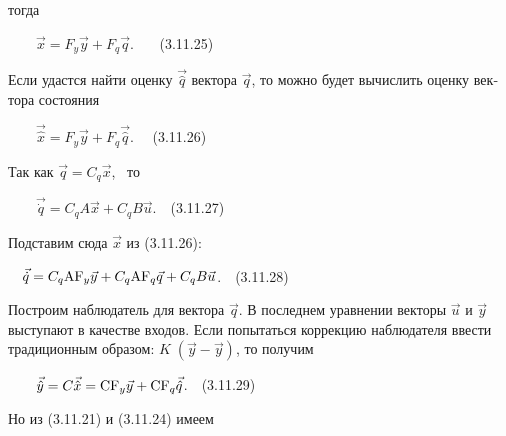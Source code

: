\documentclass[a4paper]{article}
\newcommand\normalsubformula[1]{\text{\mathversion{normal}$#1$}}
\begin{document}
{\begin{russian}\sffamily
тогда\ \ \ \ 
\end{russian}}

{\begin{russian}\sffamily
\ \ \ \  $\vec x=F_y\vec y+F_q\vec q$. \ \ \ (3.11.25)
\end{russian}}

{\begin{russian}\sffamily
Если удастся найти оценку  $\vec{\hat q}$ вектора  $\vec q$, то можно будет вычислить оценку вектора состояния \ 
\end{russian}}

{\begin{russian}\sffamily
\ \ \ \  $\vec{\hat x}=F_y\vec y+F_q\vec{\hat q}$. \ \ (3.11.26)
\end{russian}}

{\begin{russian}\sffamily
Так как  $\vec q=C_q\vec x$, \ то \ 
\end{russian}}

{\begin{russian}\sffamily
\ \ \ \  $\vec{\dot q}=C_qA\vec x+C_qB\vec u$.\ \ (3.11.27)
\end{russian}}

{\begin{russian}\sffamily
Подставим сюда  $\vec x$ из (3.11.26):
\end{russian}}

{\begin{russian}\sffamily
\ \  $\vec{\dot q}=C_q\normalsubformula{\text{AF}}_y\vec y+C_q\normalsubformula{\text{AF}}_q\vec q+C_qB\vec
u$.\ \ (3.11.28)
\end{russian}}

{\begin{russian}\sffamily
Построим наблюдатель для вектора  $\vec q$. В последнем уравнении векторы  $\vec u$ и  $\vec y$ выступают в качестве
входов. Если попытаться коррекцию наблюдателя ввести традиционным образом:  $K\;\left(\vec y-\vec y\right)$, то получим
\end{russian}}


\bigskip

{\begin{russian}\sffamily
\ \ \ \  $\vec{\hat y}=C\vec{\hat x}=\normalsubformula{\text{CF}}_y\vec y+\normalsubformula{\text{CF}}_q\vec{\hat
q}$.\ \ (3.11.29)
\end{russian}}

{\begin{russian}\sffamily
Но из (3.11.21) и (3.11.24) имеем
\end{russian}}
\end{document}
